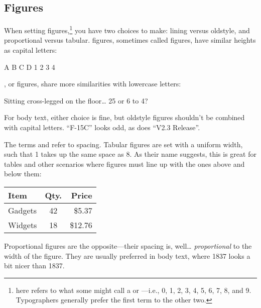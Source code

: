\subsection{Figures}

When setting figures,\punckern\footnote{
here refers to what some might call a  or
---i.e., 0, 1, 2, 3, 4, 5, 6, 7, 8, and 9.
Typographers generally prefer the first term to the other two.}
you have two
choices to make: lining versus oldstyle,
and proportional versus tabular.
 figures, sometimes called  figures,
have similar heights as capital letters:
\begin{leftfigure}
A B C D 1 2 3 4
\end{leftfigure}
, or  figures,
share more similarities with lowercase letters:
\begin{leftfigure}
Sitting cross-legged on the floor\ldots{} 25 or 6 to 4?
\end{leftfigure}
For body text, either choice is fine, but oldstyle figures shouldn't
be combined with capital letters.
``F-15C'' looks odd, as does ``V2.3 Release''\quotekern.

{
The terms  and  refer to spacing.
Tabular figures are set with a uniform width, such that 1 takes up
the same space as 8.
As their name suggests, this is great for tables and other scenarios
where figures must line up with the ones above and below them:}
\begin{leftfigure}
\begin{tabular}{l|c r}
Item & Qty. & Price \\
\hline
Gadgets & 42 & \$5.37 \\
Widgets & 18 & \$12.76 \\
\end{tabular}
\end{leftfigure}
Proportional figures are the opposite---their spacing is, well\ldots{}
\emph{proportional} to the width of the figure.
They are usually preferred in body text, where 1837
looks a bit nicer than
{1837}.

